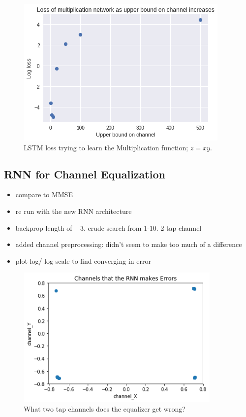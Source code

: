 \begin{figure}
\begin{center}
\includegraphics{figures/equal/Channel_upper_bound_multiplication.png}
\caption{LSTM loss trying to learn the Multiplication function; $z=xy$.}
\end{center}
\label{fig:mult_bound}
\end{figure}

\subsection{RNN for Channel Equalization}

\begin{itemize}
\item compare to MMSE
\item re run with the new RNN architecture
\item backprop length of ~ 3. crude search from 1-10. 2 tap channel
\item added channel preprocessing: didn't seem to make too much of a difference
\item plot log/ log scale to find converging in error
\end{itemize}

\begin{figure}
\begin{center}
\includegraphics[width=100mm]{figures/equal/incorrect_channels.png}
\caption{What two tap channels does the equalizer get wrong?}
\label{fig:incorr_chan}
\end{center}
\end{figure}

